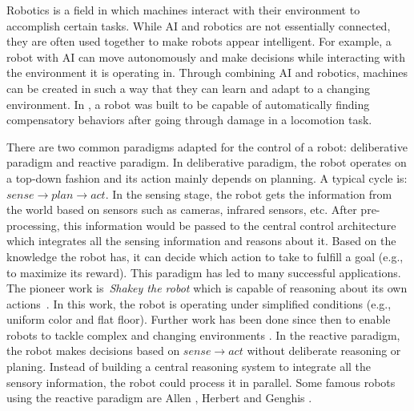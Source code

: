 Robotics is a field in which machines interact with their environment to accomplish certain tasks. While AI and robotics are not essentially connected, they are often used together to make robots appear intelligent. For example, a robot with AI can move autonomously and make decisions while interacting with the environment it is operating in. Through combining AI and robotics, machines can be created in such a way that they can learn and adapt to a changing environment. In \cite{Cully2015}, a robot was built to be capable of automatically finding compensatory behaviors after going through damage in a locomotion task. 

There are two common paradigms adapted for the control of a robot: deliberative paradigm and reactive paradigm. In deliberative paradigm, the robot operates on a top-down fashion and its action mainly depends on planning. A typical cycle is: $sense \rightarrow plan \rightarrow act$. In the sensing stage, the robot gets the information from the world based on sensors such as cameras, infrared sensors, etc. After pre-processing, this information would be passed to the central control architecture which integrates all the sensing information and reasons about it. Based on the knowledge the robot has, it can decide which action to take to fulfill a goal (e.g., to maximize its reward). This paradigm has led to many successful applications. The pioneer work is~\textit{Shakey the robot} which is capable of reasoning about its own actions~\cite{Nilsson1984}. In this work, the robot is operating under simplified conditions (e.g., uniform color and flat floor). Further work has been done since then to enable robots to tackle complex and changing environments \cite{Dimitrov:ICSMC:2013}. In the reactive paradigm, the robot makes decisions based on $sense \rightarrow act$ without deliberate reasoning or planing. Instead of building a central reasoning system to integrate all the sensory information, the robot could process it in parallel. Some famous robots using the reactive paradigm are Allen \cite{Brooks1986}, Herbert \cite{Buchanan:1984} and Genghis \cite{Brooks:1989}. 
 
